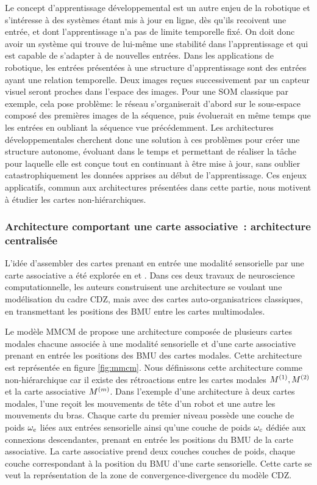 \documentclass[../main]{subfiles}
\begin{document}
Le concept d'apprentissage  développemental est un autre enjeu de la robotique et s'intéresse à des systèmes étant mis à jour en ligne, dès qu'ils recoivent une entrée, et dont l'apprentissage n'a pas de limite temporelle fixé. On doit donc avoir un système qui trouve de lui-même une stabilité dans l'apprentissage et qui est capable de s'adapter à de nouvelles entrées.
Dans les applications de robotique, les entrées présentées à une structure d'apprentissage sont des entrées ayant une relation temporelle. Deux images reçues successivement par un capteur visuel seront proches dans l'espace des images. Pour une SOM classique par exemple, cela pose problème: le réseau s'organiserait d'abord sur le sous-espace composé des premières images de la séquence, puis évoluerait en même temps que les entrées en oubliant la séquence vue précédemment.
Les architectures développementales cherchent donc une solution à ces problèmes pour créer une structure autonome, évoluant dans le temps et permettant de réaliser la tâche pour laquelle elle est conçue tout en continuant à être mise à jour, sans oublier catastrophiquement les données apprises au début de l'apprentissage.
Ces enjeux applicatifs, commun aux architectures présentées dans cette partie, nous motivent à étudier les cartes non-hiérarchiques.

\subsubsection{Architecture comportant une carte associative~: architecture centralisée}

L'idée d'assembler des cartes prenant en entrée une modalité sensorielle par une carte associative a été explorée en \cite{dominey13} et \cite{escobar-juarez_self-organized_2016}.
Dans ces deux travaux de neuroscience computationnelle, les auteurs construisent une architecture se voulant une modélisation du cadre CDZ, mais avec des cartes auto-organisatrices classiques, en transmettant les positions des BMU entre les cartes multimodales. 

Le modèle MMCM de \cite{dominey13} propose une architecture composée de plusieurs cartes modales chacune associée à une modalité sensorielle et d'une carte associative prenant en entrée les positions des BMU des cartes modales. Cette architecture est représentée en figure \ref{fig:mmcm}. 
Nous définissons cette architecture comme non-hiérarchique car il existe des rétroactions entre les cartes modales $M^{({1})},M^{({2})}$ et la carte associative $M^{({m})}$.
Dans l'exemple d'une architecture à deux cartes modales, l'une reçoit les mouvements de tête d'un robot et une autre les mouvements du bras.
Chaque carte du premier niveau possède une couche de poids $\omega_e$ liées aux entrées sensorielle ainsi qu'une couche de poids $ \omega_c$ dédiée aux connexions descendantes, prenant en entrée les positions du BMU de la carte associative.
La carte associative prend deux couches couches de poids, chaque couche correspondant à la position du BMU d'une carte sensorielle. Cette carte se veut la représentation de la zone de convergence-divergence du modèle CDZ.
\end{document}

